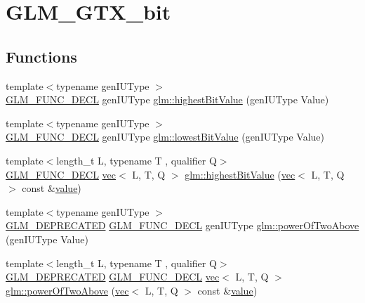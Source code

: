 \hypertarget{group__gtx__bit}{}\section{G\+L\+M\+\_\+\+G\+T\+X\+\_\+bit}
\label{group__gtx__bit}
\subsection*{Functions}
\begin{DoxyCompactItemize}
\item 
{\footnotesize template$<$typename gen\+I\+U\+Type $>$ }\\\hyperlink{setup_8hpp_ab2d052de21a70539923e9bcbf6e83a51}{G\+L\+M\+\_\+\+F\+U\+N\+C\+\_\+\+D\+E\+CL} gen\+I\+U\+Type \hyperlink{group__gtx__bit_ga0dcc8fe7c3d3ad60dea409281efa3d05}{glm\+::highest\+Bit\+Value} (gen\+I\+U\+Type Value)
\item 
{\footnotesize template$<$typename gen\+I\+U\+Type $>$ }\\\hyperlink{setup_8hpp_ab2d052de21a70539923e9bcbf6e83a51}{G\+L\+M\+\_\+\+F\+U\+N\+C\+\_\+\+D\+E\+CL} gen\+I\+U\+Type \hyperlink{group__gtx__bit_ga2ff6568089f3a9b67f5c30918855fc6f}{glm\+::lowest\+Bit\+Value} (gen\+I\+U\+Type Value)
\item 
{\footnotesize template$<$length\+\_\+t L, typename T , qualifier Q$>$ }\\\hyperlink{setup_8hpp_ab2d052de21a70539923e9bcbf6e83a51}{G\+L\+M\+\_\+\+F\+U\+N\+C\+\_\+\+D\+E\+CL} \hyperlink{structglm_1_1vec}{vec}$<$ L, T, Q $>$ \hyperlink{group__gtx__bit_ga898ef075ccf809a1e480faab48fe96bf}{glm\+::highest\+Bit\+Value} (\hyperlink{structglm_1_1vec}{vec}$<$ L, T, Q $>$ const \&\hyperlink{_s_d_l__opengl__glext_8h_a8ad81492d410ff2ac11f754f4042150f}{value})
\item 
{\footnotesize template$<$typename gen\+I\+U\+Type $>$ }\\\hyperlink{setup_8hpp_a8edfb48cdc249a3ee48406bf179023dc}{G\+L\+M\+\_\+\+D\+E\+P\+R\+E\+C\+A\+T\+ED} \hyperlink{setup_8hpp_ab2d052de21a70539923e9bcbf6e83a51}{G\+L\+M\+\_\+\+F\+U\+N\+C\+\_\+\+D\+E\+CL} gen\+I\+U\+Type \hyperlink{group__gtx__bit_ga8cda2459871f574a0aecbe702ac93291}{glm\+::power\+Of\+Two\+Above} (gen\+I\+U\+Type Value)
\item 
{\footnotesize template$<$length\+\_\+t L, typename T , qualifier Q$>$ }\\\hyperlink{setup_8hpp_a8edfb48cdc249a3ee48406bf179023dc}{G\+L\+M\+\_\+\+D\+E\+P\+R\+E\+C\+A\+T\+ED} \hyperlink{setup_8hpp_ab2d052de21a70539923e9bcbf6e83a51}{G\+L\+M\+\_\+\+F\+U\+N\+C\+\_\+\+D\+E\+CL} \hyperlink{structglm_1_1vec}{vec}$<$ L, T, Q $>$ \hyperlink{group__gtx__bit_ga2bbded187c5febfefc1e524ba31b3fab}{glm\+::power\+Of\+Two\+Above} (\hyperlink{structglm_1_1vec}{vec}$<$ L, T, Q $>$ const \&\hyperlink{_s_d_l__opengl__glext_8h_a8ad81492d410ff2ac11f754f4042150f}{value})

\end{DoxyCompactItemize}
